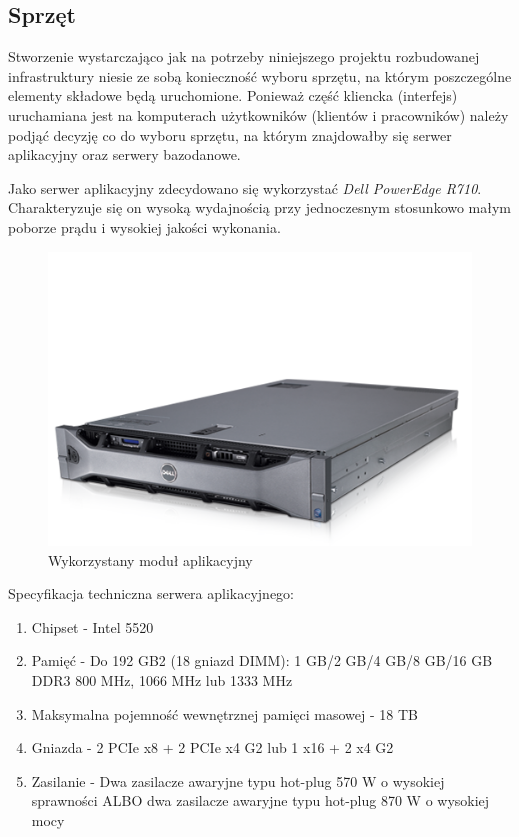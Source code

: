 \subsection{Sprzęt}

Stworzenie wystarczająco jak na potrzeby niniejszego projektu rozbudowanej
infrastruktury niesie ze sobą konieczność wyboru sprzętu, na którym poszczególne
elementy składowe będą uruchomione. Ponieważ część kliencka (interfejs)
uruchamiana jest na komputerach użytkowników (klientów i pracowników) należy
podjąć decyzję co do wyboru sprzętu, na którym znajdowałby się serwer
aplikacyjny oraz serwery bazodanowe.

Jako serwer aplikacyjny zdecydowano się wykorzystać \emph{Dell PowerEdge R710}.
Charakteryzuje się on wysoką wydajnością przy jednoczesnym stosunkowo małym
poborze prądu i wysokiej jakości wykonania.

\begin{figure}[h!]
    \includegraphics[width=\textwidth,
    height=0.2\textheight]{graphics/SerwerAplikacyjny.jpg}
  \caption{Wykorzystany moduł aplikacyjny}
\end{figure}

Specyfikacja techniczna serwera aplikacyjnego:

\begin{enumerate}
  \item Chipset - Intel 5520
  \item Pamięć - Do 192 GB2 (18 gniazd DIMM): 1 GB/2 GB/4 GB/8 GB/16 GB DDR3 800
  MHz, 1066 MHz lub 1333 MHz
  \item Maksymalna pojemność wewnętrznej pamięci masowej - 18 TB
  \item Gniazda - 2 PCIe x8 + 2 PCIe x4 G2 lub 1 x16 + 2 x4 G2
  \item Zasilanie - Dwa zasilacze awaryjne typu hot-plug 570 W o wysokiej sprawności ALBO dwa zasilacze awaryjne typu hot-plug 870 W o wysokiej mocy
  
\end{enumerate}


